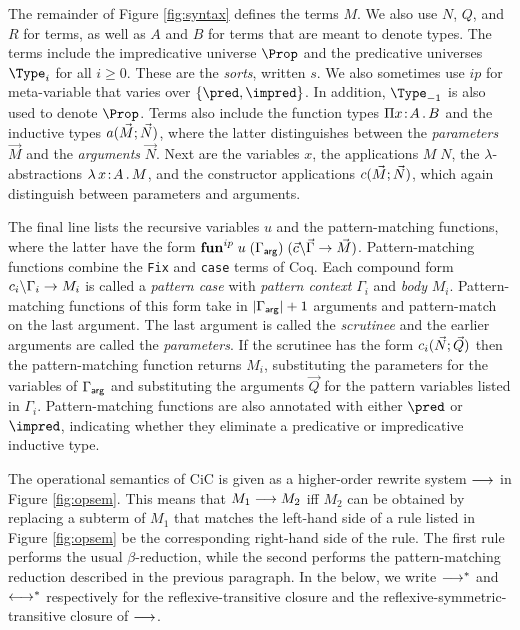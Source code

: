 \documentclass{article}
\begin{document}
The remainder of Figure \ref{fig:syntax} defines the terms $M$.  We
also use $N$, $Q$, and $R$ for terms, as well as $A$ and $B$ for terms
that are meant to denote types.  The terms include the impredicative
universe $\Prop$ and the predicative universes $\Type_i$ for all
$i\geq 0$. These are the \emph{sorts}, written $s$.  We also sometimes
use $ip$ for meta-variable that varies over $\{\pred,\impred\}$.  In
addition, $\Type_{-1}$ is also used to denote $\Prop$.  Terms also
include the function types $\pitype{x}{A}{B}$ and the inductive types
$\ctorapp{a}{\vec{M}}{\vec{N}}$, where the latter distinguishes
between the \emph{parameters} $\vec{M}$ and the \emph{arguments}
$\vec{N}$. Next are the variables $x$, the applications $M\;N$, the
$\lambda$-abstractions $\lamabs{x}{A}{M}$, and the constructor
applications $\ctorapp{c}{\vec{M}}{\vec{N}}$, which again
distinguish between parameters and arguments.

The final line lists the recursive variables $u$ and the
pattern-matching functions, where the latter have the form
$\pmfun[ip]{u}{\Gammaarg}{\pc{\vec{c}}{\vec{\Gamma}}{\vec{M}}}$.
Pattern-matching functions combine the \texttt{Fix} and \texttt{case}
terms of Coq. Each compound form $\pc{c_i}{\Gamma_i}{M_i}$ is called a
\emph{pattern case} with \emph{pattern context} $\Gamma_i$ and
\emph{body} $M_i$.  Pattern-matching functions of this form take in
$|\Gammaarg|+1$ arguments and pattern-match on the last argument. The
last argument is called the \emph{scrutinee} and the earlier arguments
are called the \emph{parameters}. If the scrutinee has the form
$\ctorapp{c_i}{\vec{N}}{\vec{Q}}$ then the pattern-matching function
returns $M_i$, substituting the parameters for the variables of
$\Gammaarg$ and substituting the arguments $\vec{Q}$ for the pattern
variables listed in $\Gamma_i$. Pattern-matching functions are also
annotated with either $\pred$ or $\impred$, indicating whether they
eliminate a predicative or impredicative inductive type.


The operational semantics of CiC is given as a higher-order rewrite
system $\rrto$ in Figure \ref{fig:opsem}. This means that $M_1\rrto
M_2$ iff $M_2$ can be obtained by replacing a subterm of $M_1$ that
matches the left-hand side of a rule listed in Figure \ref{fig:opsem}
be the corresponding right-hand side of the rule.  The first rule
performs the usual $\beta$-reduction, while the second performs the
pattern-matching reduction described in the previous paragraph.  In
the below, we write $\rrtostar$ and $\conv$ respectively
for the reflexive-transitive closure
and the reflexive-symmetric-transitive closure of $\rrto$.
\end{document}
